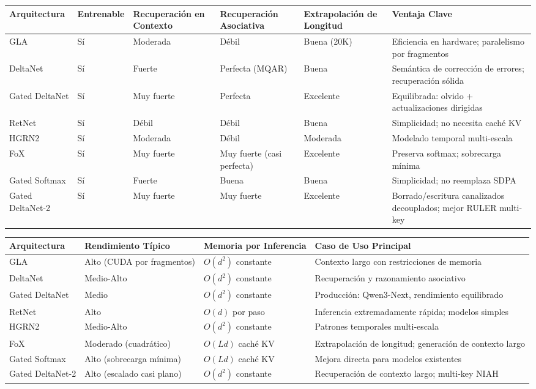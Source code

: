 \documentclass[11pt,a4paper]{article}
\begin{document}
\footnotesize
\begin{longtable}{p{1.8cm}p{2.0cm}p{2.2cm}p{2.2cm}p{2.2cm}p{1.8cm}}
\toprule
\textbf{Arquitectura} & \textbf{Entrenable} & \textbf{Recuperación en Contexto} & \textbf{Recuperación Asociativa} & \textbf{Extrapolación de Longitud} & \textbf{Ventaja Clave} \\
\midrule
\endhead
GLA & Sí & Moderada & Débil & Buena (20K) & Eficiencia en hardware; paralelismo por fragmentos \\
DeltaNet & Sí & Fuerte & Perfecta (MQAR) & Buena & Semántica de corrección de errores; recuperación sólida \\
Gated DeltaNet & Sí & Muy fuerte & Perfecta & Excelente & Equilibrada: olvido + actualizaciones dirigidas \\
RetNet & Sí & Débil & Débil & Buena & Simplicidad; no necesita caché KV \\
HGRN2 & Sí & Moderada & Débil & Moderada & Modelado temporal multi-escala \\
FoX & Sí & Muy fuerte & Muy fuerte (casi perfecta) & Excelente & Preserva softmax; sobrecarga mínima \\
Gated Softmax & Sí & Fuerte & Buena & Buena & Simplicidad; no reemplaza SDPA \\
Gated DeltaNet-2 & Sí & Muy fuerte & Muy fuerte & Excelente & Borrado/escritura canalizados decouplados; mejor RULER multi-key \\
\bottomrule
\end{longtable}
\normalsize

\medskip

\footnotesize
\begin{longtable}{p{2.0cm}p{2.4cm}p{2.8cm}p{3.4cm}}
\toprule
\textbf{Arquitectura} & \textbf{Rendimiento Típico} & \textbf{Memoria por Inferencia} & \textbf{Caso de Uso Principal} \\
\midrule
\endhead
GLA & Alto (CUDA por fragmentos) & $O(d^2)$ constante & Contexto largo con restricciones de memoria \\
DeltaNet & Medio-Alto & $O(d^2)$ constante & Recuperación y razonamiento asociativo \\
Gated DeltaNet & Medio & $O(d^2)$ constante & Producción: Qwen3-Next, rendimiento equilibrado \\
RetNet & Alto & $O(d)$ por paso & Inferencia extremadamente rápida; modelos simples \\
HGRN2 & Medio-Alto & $O(d^2)$ constante & Patrones temporales multi-escala \\
FoX & Moderado (cuadrático) & $O(Ld)$ caché KV & Extrapolación de longitud; generación de contexto largo \\
Gated Softmax & Alto (sobrecarga mínima) & $O(Ld)$ caché KV & Mejora directa para modelos existentes \\
Gated DeltaNet-2 & Alto (escalado casi plano) & $O(d^2)$ constante & Recuperación de contexto largo; multi-key NIAH \\
\bottomrule
\end{longtable}
\normalsize
\end{document}
